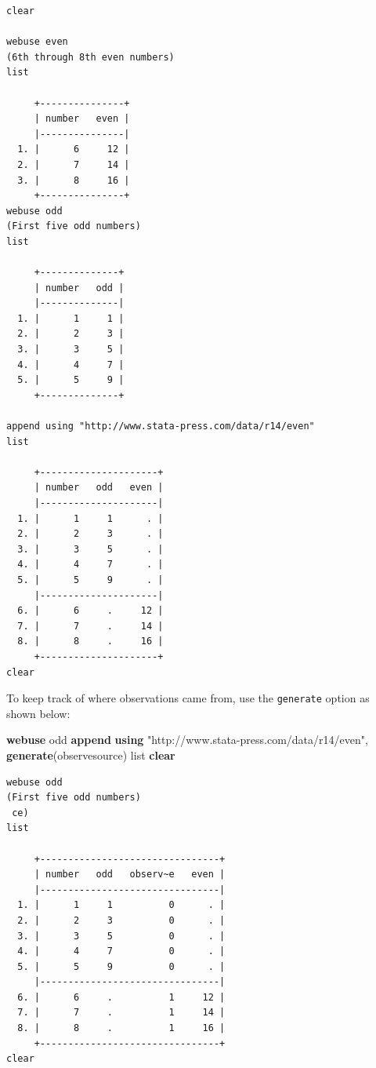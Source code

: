 \documentclass[
]{book}
\newenvironment{Shaded}{\begin{snugshade}}{\end{snugshade}}
\newcommand{\KeywordTok}[1]{\textcolor[rgb]{0.13,0.29,0.53}{\textbf{#1}}}
\newcommand{\NormalTok}[1]{#1}
\newcommand{\OtherTok}[1]{\textcolor[rgb]{0.56,0.35,0.01}{#1}}
\newcommand{\StringTok}[1]{\textcolor[rgb]{0.31,0.60,0.02}{#1}}
\begin{document}
\begin{verbatim}
clear

webuse even
(6th through 8th even numbers)
list

     +---------------+
     | number   even |
     |---------------|
  1. |      6     12 |
  2. |      7     14 |
  3. |      8     16 |
     +---------------+
webuse odd
(First five odd numbers)
list

     +--------------+
     | number   odd |
     |--------------|
  1. |      1     1 |
  2. |      2     3 |
  3. |      3     5 |
  4. |      4     7 |
  5. |      5     9 |
     +--------------+

append using "http://www.stata-press.com/data/r14/even"
list

     +---------------------+
     | number   odd   even |
     |---------------------|
  1. |      1     1      . |
  2. |      2     3      . |
  3. |      3     5      . |
  4. |      4     7      . |
  5. |      5     9      . |
     |---------------------|
  6. |      6     .     12 |
  7. |      7     .     14 |
  8. |      8     .     16 |
     +---------------------+
clear
\end{verbatim}

To keep track of where observations came from, use the \texttt{generate} option as shown below:

\begin{Shaded}
\begin{Highlighting}[]
  \KeywordTok{webuse}\NormalTok{ odd}
  \KeywordTok{append} \KeywordTok{using} \StringTok{"http://www.stata-press.com/data/r14/even"}\NormalTok{, }\KeywordTok{generate}\NormalTok{(observesource)}
  \OtherTok{list}
  \KeywordTok{clear}
\end{Highlighting}
\end{Shaded}

\begin{verbatim}
webuse odd
(First five odd numbers)
 ce)
list

     +--------------------------------+
     | number   odd   observ~e   even |
     |--------------------------------|
  1. |      1     1          0      . |
  2. |      2     3          0      . |
  3. |      3     5          0      . |
  4. |      4     7          0      . |
  5. |      5     9          0      . |
     |--------------------------------|
  6. |      6     .          1     12 |
  7. |      7     .          1     14 |
  8. |      8     .          1     16 |
     +--------------------------------+
clear
\end{verbatim}
\end{document}
